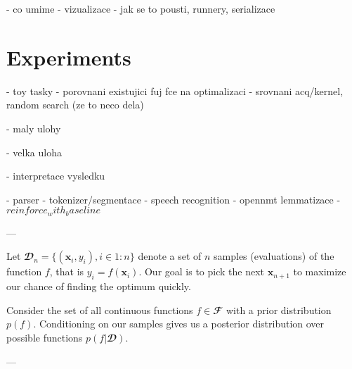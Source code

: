 - co umime
- vizualizace
- jak se to pousti, runnery, serializace



\chapter{Experiments}

- toy tasky
  - porovnani existujici fuj fce na optimalizaci
  - srovnani acq/kernel, random search (ze to neco dela)

- maly ulohy

- velka uloha

- interpretace vysledku





- parser
- tokenizer/segmentace
- speech recognition
- opennmt lemmatizace
- $reinforce_with_baseline$





---

Let $𝓓_n = \{ (\symbf{x}_i, y_i), i \in 1:n\}$ denote a set of $n$ samples
(evaluations) of the function $f$, that is $y_i = f(\symbf{x}_i)$. Our goal is
to pick the next $\symbf{x}_{n+1}$ to maximize our chance of finding the
optimum quickly.

Consider the set of all continuous functions $f ∈ 𝓕$ with a prior distribution
$p(f)$.  Conditioning on our samples gives us a posterior distribution over
possible functions $p(f | 𝓓)$.

---

